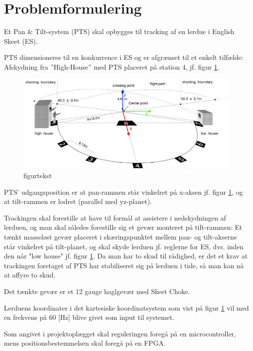 \section{Problemformulering}

Et Pan \& Tilt-system (PTS) skal opbygges til tracking af en lerdue i English Skeet (ES).

PTS dimensioneres til en konkurrence i ES og er afgrænset til et enkelt tilfælde:
Afskydning fra ”High-House” med PTS placeret på station 4, jf. figur \ref{fig:ES}.
\begin{figure}[th!]
\centering
\includegraphics[width=1\textwidth]{./graphics/skeet_diagram_cropped_axes}
\caption[tekst i indholdsfortegnelsen]{figurtekst}
\label{fig:ES}
\end{figure}	
PTS' udgangsposition er at pan-rammen står vinkelret på x-aksen jf. figur \ref{fig:ES},
og at tilt-rammen er lodret (parallel med yz-planet).

Trackingen skal forestille at have til formål at assistere i nedskydningen af lerduen,
og man skal således forestille sig et gevær monteret på tilt-rammen:
Et tænkt masseløst gevær placeret i skæringspunktet mellem pan- og tilt-akserne står vinkelret
på tilt-planet, og skal skyde lerduen jf. reglerne for ES, dvs. inden den når "low house" jf. figur \ref{fig:ES}.
Da man har to skud til rådighed, er det et krav at trackingen foretaget af PTS har stabiliseret sig på lerduen
i tide, så man kan nå at affyre to skud.

Det tænkte gevær er et 12 gauge haglgevær med Skeet Choke.

Lerduens koordinater i det kartesiske koordinatsystem som vist på figur \ref{fig:ES}
vil med en frekvens på 60 [Hz] blive givet som input til systemet.

Som angivet i projektoplægget skal reguleringen foregå på en microcontroller,
mens positionsbestemmelsen skal foregå på en FPGA.
